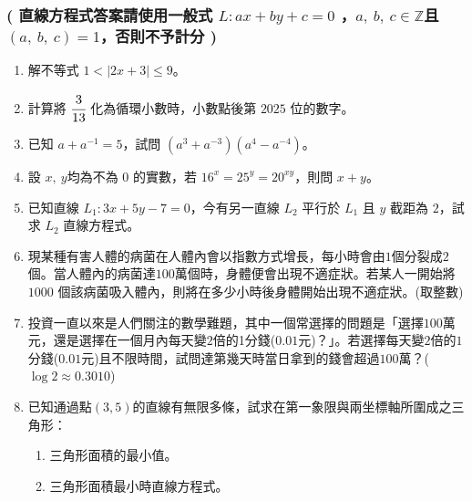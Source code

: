 \documentclass[b4paper,12pt]{exam}
\begin{document}
\subsubsection*{( 直線方程式答案請使用一般式 $L:ax+by+c=0$ ，$a,\ b,\ c\in \mathbb{Z}$且$(a,\ b,\ c)=1$，否則不予計分 )}
\vspace{0.75em}
\begin{enumerate}[itemsep=5em, topsep=2em]\setcounter{enumi}{0}

    \item 解不等式 $1<|2x+3|\leq9$。

    \item 計算將 $\cfrac{3}{13}$ 化為循環小數時，小數點後第 $2025$ 位的數字。

    \item 已知 $a+a^{-1}=5$，試問 $(a^3+a^{-3})(a^4-a^{-4})$。

    \item 設 $x,\ y$均為不為 $0$ 的實數，若 $16^x=25^y=20^{xy}$，則問 $x+y$。
    
    \newpage

    \item 已知直線 $L_1:3x+5y-7=0$，今有另一直線 $L_2$ 平行於 $L_1$ 且 $y$ 截距為 $2$，試求 $L_2$ 直線方程式。

    \item 現某種有害人體的病菌在人體內會以指數方式增長，每小時會由$1$個分裂成$2$個。當人體內的病菌達$100$萬個時，身體便會出現不適症狀。若某人一開始將 $1000$ 個該病菌吸入體內，則將在多少小時後身體開始出現不適症狀。(取整數)

    \item 投資一直以來是人們關注的數學難題，其中一個常選擇的問題是「選擇$100$萬元，還是選擇在一個月內每天變$2$倍的1分錢($0.01$元)？」。若選擇每天變$2$倍的$1$分錢($0.01$元)且不限時間，試問達第幾天時當日拿到的錢會超過$100$萬？($\log{2}\approx0.3010$)

    \item 已知通過點$(3,5)$的直線有無限多條，試求在第一象限與兩坐標軸所圍成之三角形：
    \begin{enumerate}
        \item 三角形面積的最小值。
        \item 三角形面積最小時直線方程式。
    \end{enumerate}


\end{enumerate}
\end{document}
